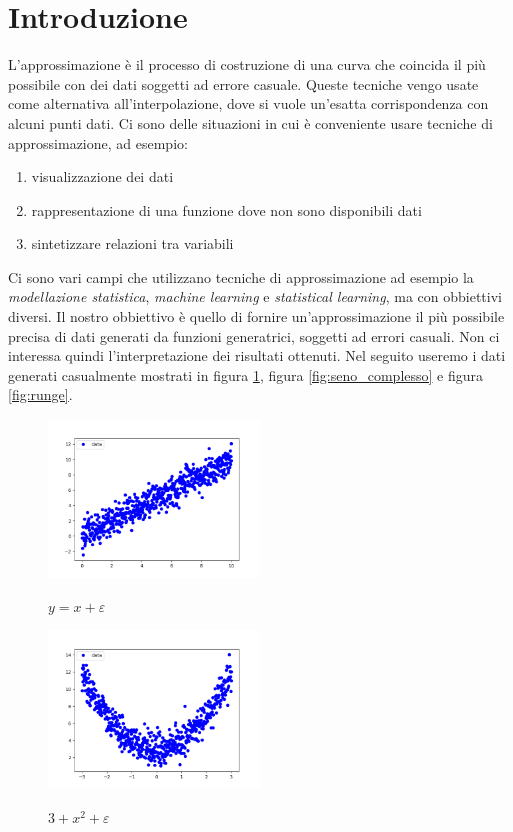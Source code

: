 \documentclass[../main.tex]{subfiles}
\begin{document}
\section{Introduzione}
L'approssimazione è il processo di costruzione di una curva che coincida il più possibile con dei  dati soggetti ad errore casuale.
Queste tecniche vengo usate come alternativa all'interpolazione, dove si vuole un'esatta corrispondenza con alcuni punti dati.
Ci sono delle situazioni in cui è conveniente usare tecniche di approssimazione, ad esempio:
\begin{enumerate}
    \item visualizzazione dei dati
    \item rappresentazione di una funzione dove non sono disponibili dati
    \item sintetizzare relazioni tra variabili
\end{enumerate}
Ci sono vari campi che utilizzano tecniche di approssimazione ad esempio la \textit{modellazione statistica}, \textit{machine learning} e 
\textit{statistical learning}, ma con obbiettivi diversi.
Il nostro obbiettivo è quello di fornire un'approssimazione il più possibile precisa di dati generati da funzioni generatrici, soggetti ad errori casuali.
Non ci interessa quindi l'interpretazione dei risultati ottenuti.
Nel seguito useremo i dati generati casualmente mostrati in figura \ref{fig:retta}, figura \ref{fig:seno_complesso} e 
figura \ref{fig:runge}.

\begin{figure}[ht]
\caption{$y = x + \varepsilon$}
\includegraphics[width=0.5\textwidth]{Immagini/Introduzione/retta.png}
\centering
\label{fig:retta}
\end{figure}

\begin{figure}[ht]
\caption{$3 + x^2 + \varepsilon$}
\includegraphics[width=0.5\textwidth]{Immagini/Introduzione/parabola.png}
\centering
\label{fig:parabola}
\end{figure}
\end{document}
